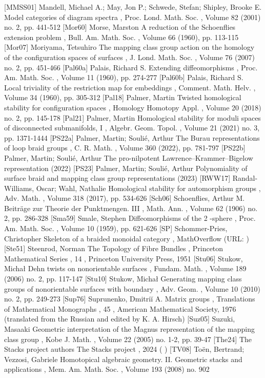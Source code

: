  [MMSS01] Mandell, Michael A.; May, Jon P.; Schwede, Stefan; Shipley, Brooke E. Model categories of diagram spectra , Proc. Lond. Math. Soc. , Volume 82 (2001) no. 2, pp. 441-512
 [Mor60] Morse, Marston A reduction of the Schoenflies extension problem , Bull. Am. Math. Soc. , Volume 66 (1960), pp. 113-115
 [Mor07] Moriyama, Tetsuhiro The mapping class group action on the homology of the configuration spaces of surfaces , J. Lond. Math. Soc. , Volume 76 (2007) no. 2, pp. 451-466
 [Pal60a] Palais, Richard S. Extending diffeomorphisms , Proc. Am. Math. Soc. , Volume 11 (1960), pp. 274-277
 [Pal60b] Palais, Richard S. Local triviality of the restriction map for embeddings , Comment. Math. Helv. , Volume 34 (1960), pp. 305-312
 [Pal18] Palmer, Martin Twisted homological stability for configuration spaces , Homology Homotopy Appl. , Volume 20 (2018) no. 2, pp. 145-178
 [Pal21] Palmer, Martin Homological stability for moduli spaces of disconnected submanifolds, I , Algebr. Geom. Topol. , Volume 21 (2021) no. 3, pp. 1371-1444
 [PS22a] Palmer, Martin; Soulié, Arthur The Burau representations of loop braid groups , C. R. Math. , Volume 360 (2022), pp. 781-797
 [PS22b] Palmer, Martin; Soulié, Arthur The pro-nilpotent Lawrence–Krammer–Bigelow representation (2022)
 [PS23] Palmer, Martin; Soulié, Arthur Polynomiality of surface braid and mapping class group representations (2023)
 [RWW17] Randal-Williams, Oscar; Wahl, Nathalie Homological stability for automorphism groups , Adv. Math. , Volume 318 (2017), pp. 534-626
 [Sch06] Schoenflies, Arthur M. Beiträge zur Theorie der Punktmengen. III , Math. Ann. , Volume 62 (1906) no. 2, pp. 286-328
 [Sma59] Smale, Stephen Diffeomorphisms of the 2 -sphere , Proc. Am. Math. Soc. , Volume 10 (1959), pp. 621-626
 [SP] Schommer-Pries, Christopher Skeleton of a braided monoidal category , MathOverflow (URL: )
 [Ste51] Steenrod, Norman The Topology of Fibre Bundles , Princeton Mathematical Series , 14 , Princeton University Press, 1951
 [Stu06] Stukow, Michał Dehn twists on nonorientable surfaces , Fundam. Math. , Volume 189 (2006) no. 2, pp. 117-147
 [Stu10] Stukow, Michał Generating mapping class groups of nonorientable surfaces with boundary , Adv. Geom. , Volume 10 (2010) no. 2, pp. 249-273
 [Sup76] Suprunenko, Dmitriĭ A. Matrix groups , Translations of Mathematical Monographs , 45 , American Mathematical Society, 1976 (translated from the Russian and edited by K. A. Hirsch)
 [Suz05] Suzuki, Masaaki Geometric interpretation of the Magnus representation of the mapping class group , Kobe J. Math. , Volume 22 (2005) no. 1-2, pp. 39-47
 [The24] The Stacks project authors The Stacks project , 2024 ( )
 [TV08] Toën, Bertrand; Vezzosi, Gabriele Homotopical algebraic geometry. II. Geometric stacks and applications , Mem. Am. Math. Soc. , Volume 193 (2008) no. 902
